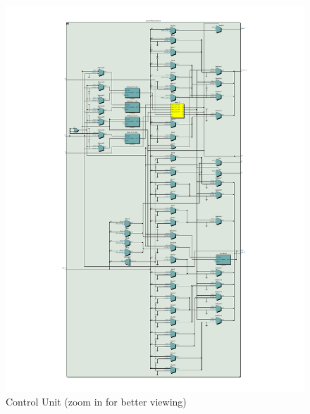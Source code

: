 \documentclass[13pt,a4paper]{report}
\begin{document}
\begin{figure}[H]
\centering
\includegraphics[scale=1, clip, trim={2cm 1cm 2cm 1.2cm}]{images/Exc1_ctrlUnit_RTL.pdf}
\caption*{Control Unit (zoom in for better viewing)}
\end{figure}
\end{document}

